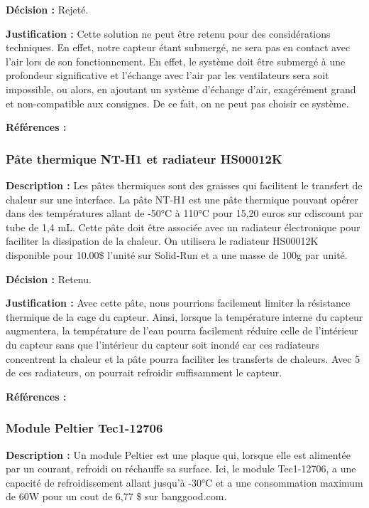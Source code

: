 \textbf{Décision :} Rejeté.

\textbf{Justification :} Cette solution ne peut être retenu pour des considérations techniques. En effet, notre capteur étant submergé, ne sera pas en contact avec l'air lors de son fonctionnement. En effet, le système doit être submergé à une profondeur significative et l'échange avec l'air par les ventilateurs sera soit impossible, ou alors, en ajoutant un système d'échange d'air, exagérément grand et non-compatible aux consignes. De ce fait, on ne peut pas choisir ce système.

\textbf{Références :} \cite{rad1} \cite{rad2}

\subsubsection{Pâte thermique NT-H1 et radiateur HS00012K}
\textbf{Description :} Les pâtes thermiques sont des graisses qui facilitent le transfert de chaleur sur une interface. La pâte NT-H1 est une pâte thermique pouvant opérer dans des températures allant de -50°C à 110°C pour 15,20 euros sur cdiscount par tube de 1,4 mL. Cette pâte doit être associée avec un radiateur électronique pour faciliter la dissipation de la chaleur. On utilisera le radiateur HS00012K disponible pour 10.00\$ l'unité sur Solid-Run et a une masse de 100g par unité.

\textbf{Décision :} Retenu.

\textbf{Justification :} Avec cette pâte, nous pourrions facilement limiter la résistance thermique de la cage du capteur. Ainsi, lorsque la température interne du capteur augmentera, la température de l'eau pourra facilement réduire celle de l'intérieur du capteur sans que l'intérieur du capteur soit inondé car ces radiateurs concentrent la chaleur et la pâte pourra faciliter les transferts de chaleurs. Avec 5 de ces radiateurs, on pourrait refroidir suffisamment le capteur.

\textbf{Références :} \cite{pate1} \cite{pate2} \cite{radi1} \cite{radi2}

\subsubsection{Module Peltier Tec1-12706}
\textbf{Description :} Un module Peltier est une plaque qui, lorsque elle est alimentée par un courant, refroidi ou réchauffe sa surface. Ici, le module Tec1-12706, a une capacité de refroidissement allant jusqu'à -30°C et a une consommation maximum de 60W pour un cout de 6,77 \$ sur banggood.com. 

